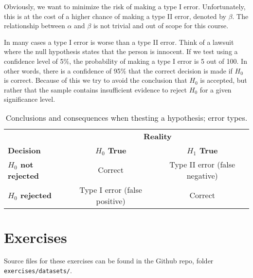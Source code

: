 Obviously, we want to minimize the risk of making a type I error.
Unfortunately, this is at the cost of a higher chance of making a type II error, denoted by $\beta$.
The relationship between $\alpha$ and $\beta$ is not trivial and out of scope for this course.

In many cases a type I error is worse than a type II error.
Think of a lawsuit where the null hypothesis states that the person is innocent.
If we test using a confidence level of 5\%, the probability of making a type I error is 5 out of 100.
In other words, there is a confidence of 95\% that the correct decision is made if $H_{0}$ is correct.
Because of this we try to avoid the conclusion that $H_{0}$ is accepted, 
but rather that the sample contains insufficient evidence to reject $H_{0}$ for a given significance level.

\begin{table}
  \centering
  \begin{tabular}{@{}l|cc@{}}
    \toprule
    & \multicolumn{2}{c}{\textbf{Reality}} \\
    \textbf{Decision}             & \textbf{$H_{0}$ True} & \textbf{$H_{1}$ True}     \\
    \midrule
    \textbf{$H_{0}$ not rejected} & Correct                       & Type II error (false negative) \\
    \textbf{$H_{0}$ rejected}     & Type I error (false positive) & Correct            \\
    \bottomrule
  \end{tabular}
  \caption{Conclusions and consequences when thesting a hypothesis; error types.}
  \label{tab:hypfouten}
\end{table}

\section{Exercises}
\label{sec:testing-procedures-exercises}

Source files for these exercises can be found in the Github repo, folder \texttt{exercises/datasets/}.



